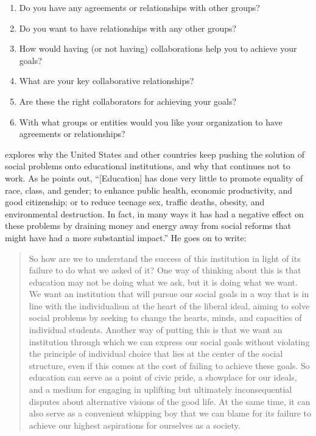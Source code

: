 \begin{enumerate}

\item
  Do you have any agreements or relationships with other groups?

\item
  Do you want to have relationships with any other groups?

\item
  How would having (or not having) collaborations help you to achieve
  your goals?

\item
  What are your key collaborative relationships?

\item
  Are these the right collaborators for achieving your goals?

\item
  With what groups or entities would you like your organization to have
  agreements or relationships?

\end{enumerate}


\cite{Laba2008} explores why the United States and other countries
keep pushing the solution of social problems onto educational
institutions, and why that continues not to work.  As he points out,
``[Education] has done very little to promote equality of race, class,
and gender; to enhance public health, economic productivity, and good
citizenship; or to reduce teenage sex, traffic deaths, obesity, and
environmental destruction. In fact, in many ways it has had a negative
effect on these problems by draining money and energy away from social
reforms that might have had a more substantial impact.''  He goes on
to write:

\begin{quote}

  So how are we to understand the success of this institution in light
  of its failure to do what we asked of it? One way of thinking about
  this is that education may not be doing what we ask, but it is doing
  what we want. We want an institution that will pursue our social
  goals in a way that is in line with the individualism at the heart
  of the liberal ideal, aiming to solve social problems by seeking to
  change the hearts, minds, and capacities of individual
  students. Another way of putting this is that we want an institution
  through which we can express our social goals without violating the
  principle of individual choice that lies at the center of the social
  structure, even if this comes at the cost of failing to achieve
  these goals. So education can serve as a point of civic pride, a
  showplace for our ideals, and a medium for engaging in uplifting but
  ultimately inconsequential disputes about alternative visions of the
  good life. At the same time, it can also serve as a convenient
  whipping boy that we can blame for its failure to achieve our
  highest aspirations for ourselves as a society.

\end{quote}

